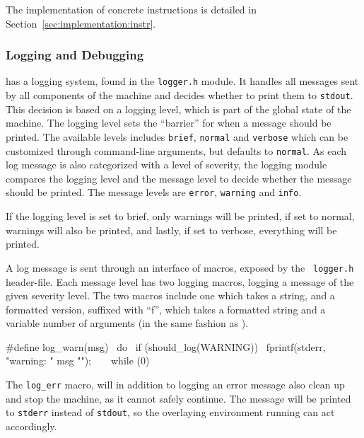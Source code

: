 The implementation of concrete instructions is detailed in
Section~\ref{sec:implementation:instr}.

\subsubsection{Logging and Debugging}
\label{sec:implementation:core:debug}

\thename{} has a logging system, found in the {\tt logger.h} module. It handles
all messages sent by all components of the machine and decides whether to print
them to {\tt stdout}. This decision is based on a logging level, which is part
of the global state of the machine. The logging level sets the ``barrier'' for
when a message should be printed. The available levels includes {\tt brief},
{\tt normal} and {\tt verbose} which can be customized through command-line
arguments, but defaults to {\tt normal}. As each log message is also categorized
with a level of severity, the logging module compares the logging level and the
message level to decide whether the message should be printed. The message
levels are {\tt error}, {\tt warning} and {\tt info}.

If the logging level is set to brief, only warnings will be printed, if set to
normal, warnings will also be printed, and lastly, if set to verbose, everything
will be printed.

A log message is sent through an interface of macros, exposed by the {\tt
  logger.h} header-file. Each message level has two logging macros, logging a
message of the given severity level. The two macros include one which takes a
string, and a formatted version, suffixed with ``f'', which takes a formatted
string and a variable number of arguments (in the same fashion as
).

\begin{minipage}{\linewidth}
\begin{ccode}
#define log_warn(msg)                             \
  do {                                            \
      if (should_log(WARNING)) {                  \
          fprintf(stderr, "warning: " msg "\n");  \
      }                                           \
  } while (0)
\end{ccode}
\end{minipage}

The {\tt log\_err} macro, will in addition to logging an error message also
clean up and stop the machine, as it cannot safely continue. The message will be
printed to {\tt stderr} instead of {\tt stdout}, so the overlaying environment
running \thename{} can act accordingly.

